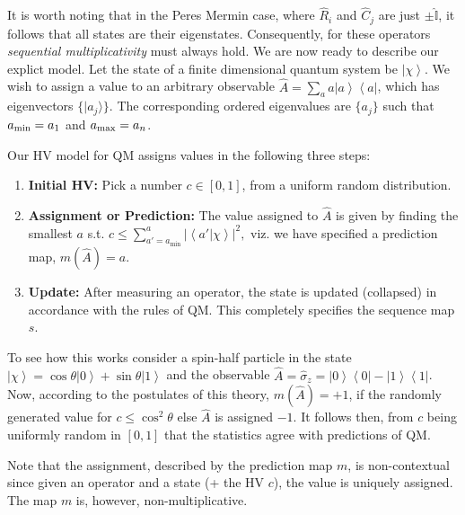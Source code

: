 \documentclass[british,aps,prl,superscriptaddress,nofootinbib,times,reprint]{revtex4-1}
\theoremstyle{plain}
\theoremstyle{definition}
\theoremstyle{remark}
\theoremstyle{remark}
\theoremstyle{remark}
\theoremstyle{plain}
\theoremstyle{plain}
\theoremstyle{plain}
\theoremstyle{definition}
\theoremstyle{definition}
\begin{document}
It is worth noting that in the Peres Mermin
case, where $\hat{R}_{i}$ and $\hat{C}_{j}$ are
just $\pm\hat{\mathbb{I}}$, it follows that all
states are their eigenstates. Consequently, for
these operators \emph{sequential multiplicativity}
must always hold.
We are now ready to describe our explict model.
Let the state of a finite dimensional quantum system
be $\left|\chi\right\rangle $. We wish to
assign a value to an arbitrary observable 
$\hat{A}=\sum_{a}a\left|a\right\rangle
\left\langle a\right|$, which has 
eigenvectors $\{ \vert
a_j\rangle \}$. The corresponding ordered eigenvalues are $\{a_j\}$ such that 
$a_{\rm min}=a_1$
and 
$a_{\rm max}=a_n$.

Our HV model for QM assigns values in the following
three steps:
\setdefaultleftmargin{0pt}{}{}{}{}{}
\begin{enumerate}
\item
{\bf Initial HV:} Pick a number
$c\in[0,1]$, from a uniform random distribution.\
\item
{\bf
Assignment or Prediction:}
 The value assigned to
$\hat{A}$ is given by finding the smallest $a$
s.t.  $c\le\sum_{a'=a_{\text{min}}}^{a}\left|\left\langle
a'|\chi\right\rangle \right|^{2},$ viz. we have
specified a prediction map, $m(\hat{A})=a$.
\item
{\bf Update:} After measuring an operator, the state is
updated (collapsed) in accordance with the rules
of QM. This completely specifies the sequence map
$s$.
\end{enumerate}
To see how this works consider 
a spin-half particle in the state
$\left|\chi\right\rangle
=\cos\theta\left|0\right\rangle
+\sin\theta\left|1\right\rangle $ and the observable
$\hat{A}=\hat{\sigma}_{z}=\left|0\right\rangle
\left\langle 0\right|-\left|1\right\rangle
\left\langle 1\right|$. Now, according to the
postulates of this theory, $m(\hat{A})=+1$, if
the randomly generated value for 
$c\le\cos^{2}\theta$ else $\hat{A}$ is assigned
$-1$. It follows then, from $c$ being uniformly
random in $[0,1]$ that the statistics agree with
predictions of QM.

Note that the assignment, described by the
prediction map $m$, is non-contextual since given
an operator and a state (+ the HV $c$), the value is
uniquely assigned. The map $m$ is, however,
non-multiplicative. 
\end{document}
